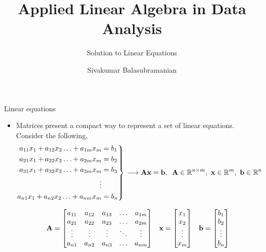 \documentclass[aspectratio=169]{beamer}
\title{Applied Linear Algebra in Data Analysis}
\subtitle{Solution to Linear Equations}
\author{Sivakumar Balasubramanian}
\institute[Christian Medical College] %
{
  \inst{}%
  Department of Bioengineering\\
  Christian Medical College, Bagayam\\
  Vellore 632002
}
\date{}
\let\olditem\item
\renewcommand{\item}{\setlength{\itemsep}{\fill}\olditem}
\def\mf{\ensuremath\mathbf}
\begin{document}
\begin{frame}
  \titlepage
\end{frame}


\begin{frame}[t]{Linear equations}
\begin{itemize}
\item Matrices present a compact way to represent a set of linear equations. Consider the following,
\[
\begin{rcases*}
\begin{split}
a_{11}x_1 + a_{12}x_2 \ldots + a_{1m}x_m & = b_1 \\
a_{21}x_1 + a_{22}x_2 \ldots + a_{2m}x_m & = b_2 \\
a_{31}x_1 + a_{32}x_2 \ldots + a_{3m}x_m & = b_3 \\
\vdots \\
a_{n1}x_1 + a_{n2}x_2 \ldots + a_{nm}x_m & = b_n \\
\end{split}
\end{rcases*} \, \longrightarrow \mf{Ax} = \mf{b}, \,\,\, \mf{A} \in \mathbb{R}^{n \times m}, \,\, \mf{x} \in \mathbb{R}^m, \,\, \mf{b} \in \mathbb{R}^n
\]

\[
\mf{A} = \begin{bmatrix}
a_{11} & a_{12} & a_{13} & \ldots & a_{1m}\\
a_{21} & a_{22} & a_{23} & \ldots & a_{2m}\\
\vdots & \vdots & \vdots & \ddots & \vdots\\
a_{n1} & a_{n2} & a_{n3} & \ldots & a_{nm}\\
\end{bmatrix} \,\,\,\,\, 
\mf{x} = \begin{bmatrix}
x_1\\ x_2\\ \vdots \\ x_m
\end{bmatrix} \,\,\,\,\,
\mf{b} = \begin{bmatrix}
b_1\\ b_2\\ \vdots \\ b_n
\end{bmatrix}
\]
\end{itemize}
\end{frame}
\end{document}

